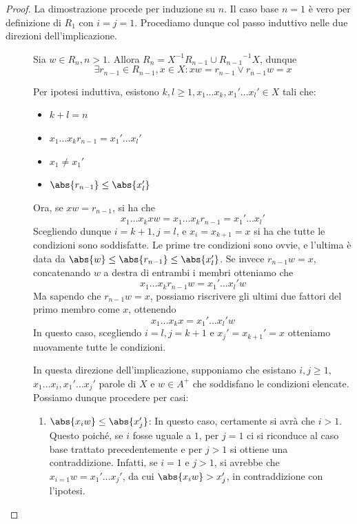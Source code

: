 \begin{proof}
  La dimostrazione procede per induzione su \(n\).
  Il caso base \(n=1\) è vero per definizione di \(R_1\) con \(i = j = 1\).
  Procediamo dunque col passo induttivo nelle due direzioni dell'implicazione.
  \begin{description}
    \item[\q{\(\implies\)}] 
      Sia \(w \in R_n, n>1\). Allora \(R_n = X^{-1}R_{n-1} \cup {R_{n-1}}^{-1}X\), dunque
      \[\exists r_{n-1} \in R_{n-1}, x \in X: xw=r_{n-1} \lor r_{n-1}w=x\]

      Per ipotesi induttiva, esistono \(k,l \geq 1, x_1\ldots x_k,x_1'\ldots x_l' \in X\) tali che:
      \begin{itemize}
        \item \(k+l=n\)
        \item \(x_1\ldots x_k r_{n-1} = x_1'\ldots x_l'\)
        \item \(x_1 \neq x_1'\)
        \item \(\abs{r_{n-1}} \leq \abs{x_l'}\)
      \end{itemize}
      Ora, se \(xw = r_{n-1}\), si ha che
      \[x_1\ldots x_k xw= x_1\ldots x_k r_{n-1} = x_1'\ldots x_l'\]
      Scegliendo dunque \(i = k+1,j=l\), e \(x_i = x_{k+1} = x\) si ha che tutte le condizioni sono soddisfatte.
      Le prime tre condizioni sono ovvie, e l'ultima è data da \(\abs{w}\leq\abs{r_{n-1}}\leq\abs{x_l'}\).
      Se invece \(r_{n-1}w = x\),  concatenando \(w\) a destra di entrambi i membri otteniamo che
      \[x_1\ldots x_k r_{n-1} w = x_1'\ldots x_l' w\]
      Ma sapendo che \(r_{n-1}w = x\), possiamo riscrivere gli ultimi due fattori del primo membro come \(x\), ottenendo
      \[x_1\ldots x_k x = x_1'\ldots x_l' w\]
      In questo caso, scegliendo \(i = l,j=k+1\) e \(x_j' = x_{k+1}' = x\) otteniamo nuovamente tutte le condizioni.
    \item[\q{\(\impliedby\)}]
      In questa direzione dell'implicazione, supponiamo che esistano \(i,j \geq 1\), \(x_1\ldots x_i,x_1'\ldots x_j'\) parole di \(X\) e \(w\in A^+\) che soddisfano le condizioni elencate.
      Possiamo dunque procedere per casi:
      \begin{enumerate}
        \item \(\abs{x_{i}w} \leq \abs{x_j'}\):
          In questo caso, certamente si avrà che \(i>1\). Questo poiché, se \(i\) fosse uguale a \(1\), per \(j=1\) ci si riconduce al caso base trattato precedentemente e per \(j>1\) si ottiene una contraddizione.
          Infatti, se \(i=1\) e \(j>1\), si avrebbe che \(x_{i=1} w = x_1'\ldots x_j'\), da cui \(\abs{x_{i}w} > x_j'\), in contraddizione con l'ipotesi.


\end{enumerate}
\end{description}
\end{proof}

